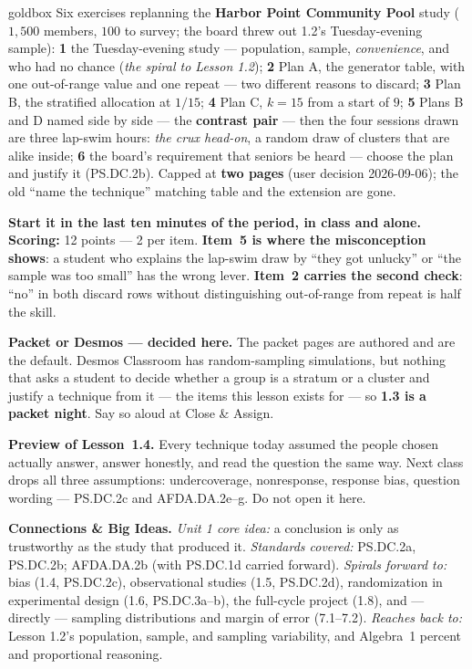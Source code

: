 \documentclass[10pt]{article}
\begin{document}
\boxguard
\begin{skillbox}{goldbox}
Six exercises replanning the \textbf{Harbor Point Community Pool} study ($1{,}500$ members,
$100$ to survey; the board threw out 1.2's Tuesday-evening sample): \textbf{1} the
Tuesday-evening study --- population, sample, \emph{convenience}, and who had no chance
(\emph{the spiral to Lesson 1.2}); \textbf{2} Plan A, the generator table, with one
out-of-range value and one repeat --- two different reasons to discard; \textbf{3} Plan B, the
stratified allocation at $1/15$; \textbf{4} Plan C, $k = 15$ from a start of $9$; \textbf{5}
Plans B and D named side by side --- the \textbf{contrast pair} --- then the four sessions
drawn are three lap-swim hours: \emph{the crux head-on}, a random draw of clusters that are
alike inside; \textbf{6} the board's requirement that seniors be heard --- choose the plan and
justify it (PS.DC.2b). Capped at \textbf{two pages} (user decision 2026-09-06); the old
``name the technique'' matching table and the extension are gone.

\textbf{Start it in the last ten minutes of the period, in class and alone.} \textbf{Scoring:}
12 points --- 2 per item. \textbf{Item~5 is where the misconception shows}: a student who
explains the lap-swim draw by ``they got unlucky'' or ``the sample was too small'' has the
wrong lever. \textbf{Item~2 carries the second check}: ``no'' in both discard rows without
distinguishing out-of-range from repeat is half the skill.

\textbf{Packet or Desmos --- decided here.} The packet pages are authored and are the default.
Desmos Classroom has random-sampling simulations, but nothing that asks a student to decide
whether a group is a stratum or a cluster and justify a technique from it --- the items this
lesson exists for --- so \textbf{1.3 is a packet night}. Say so aloud at Close \& Assign.

\textbf{Preview of Lesson~1.4.} Every technique today assumed the people chosen actually
answer, answer honestly, and read the question the same way. Next class drops all three
assumptions: undercoverage, nonresponse, response bias, question wording --- PS.DC.2c and
AFDA.DA.2e--g. Do not open it here.

\textbf{Connections \& Big Ideas.} \textit{Unit 1 core idea:} a conclusion is only as
trustworthy as the study that produced it. \textit{Standards covered:} PS.DC.2a, PS.DC.2b;
AFDA.DA.2b (with PS.DC.1d carried forward). \textit{Spirals forward to:} bias (1.4, PS.DC.2c),
observational studies (1.5, PS.DC.2d), randomization in experimental design (1.6,
PS.DC.3a--b), the full-cycle project (1.8), and --- directly --- sampling distributions and
margin of error (7.1--7.2). \textit{Reaches back to:} Lesson 1.2's population, sample, and
sampling variability, and Algebra~1 percent and proportional reasoning.
\end{skillbox}
\end{document}
